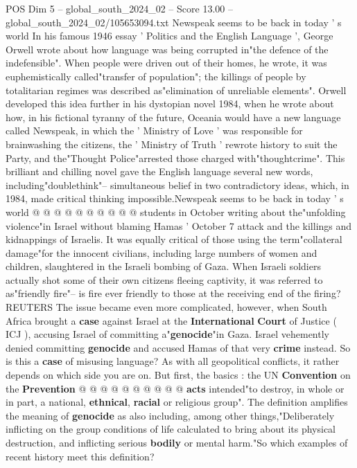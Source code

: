 \begin{textsample}{POS Dim 5 – global\_south\_2024\_02 – Score 13.00 – global\_south\_2024\_02/105653094.txt}  \label{ex:f5_pos_159}
Newspeak seems to be back in today ' s world In his famous 1946 essay ' Politics and the English Language ', George Orwell wrote about how language was being corrupted in"the defence of the indefensible".
When people were driven out of their homes, he wrote, it was euphemistically called"transfer of population"; the killings of people by totalitarian regimes was described as"elimination of unreliable elements".
Orwell developed this idea further in his dystopian novel 1984, when he wrote about how, in his fictional tyranny of the future, Oceania would have a new language called Newspeak, in which the ' Ministry of Love ' was responsible for brainwashing the citizens, the ' Ministry of Truth ' rewrote history to suit the Party, and the"Thought Police"arrested those charged with"thoughtcrime".
This brilliant and chilling novel gave the English language several new words, including"doublethink"-- simultaneous belief in two contradictory ideas, which, in 1984, made critical thinking impossible.Newspeak seems to be back in today ' s world @ @ @ @ @ @ @ @ @ @ students in October writing about the"unfolding violence"in Israel without blaming Hamas ' October 7 attack and the killings and kidnappings of Israelis.
It was equally critical of those using the term"collateral damage"for the innocent civilians, including large numbers of women and children, slaughtered in the Israeli bombing of Gaza.
When Israeli soldiers actually shot some of their own citizens fleeing captivity, it was referred to as"friendly fire"-- is fire ever friendly to those at the receiving end of the firing?
REUTERS The issue became even more complicated, however, when South Africa brought a \textbf{case} against Israel at the \textbf{International} \textbf{Court} of Justice ( ICJ ), accusing Israel of committing a"\textbf{genocide}"in Gaza.
Israel vehemently denied committing \textbf{genocide} and accused Hamas of that very \textbf{crime} instead.
So is this a \textbf{case} of misusing language?
As with all geopolitical conflicts, it rather depends on which side you are on.
But first, the basics : the UN \textbf{Convention} on the \textbf{Prevention} @ @ @ @ @ @ @ @ @ @ \textbf{acts} intended"to destroy, in whole or in part, a national, \textbf{ethnical}, \textbf{racial} or religious group".
The definition amplifies the meaning of \textbf{genocide} as also including, among other things,"Deliberately inflicting on the group conditions of life calculated to bring about its physical destruction, and inflicting serious \textbf{bodily} or mental harm."So which examples of recent history meet this definition?

\end{textsample}
